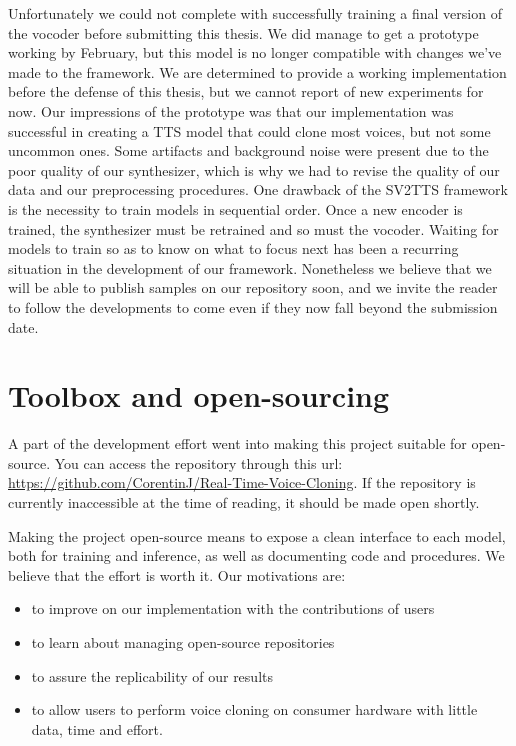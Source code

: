 \documentclass[a4paper, oneside, 12pt, english]{article}
\begin{document}
Unfortunately we could not complete with successfully training a final version of the vocoder before submitting this thesis. We did manage to get a prototype working by February, but this model is no longer compatible with changes we've made to the framework. We are determined to provide a working implementation before the defense of this thesis, but we cannot report of new experiments for now. Our impressions of the prototype was that our implementation was successful in creating a TTS model that could clone most voices, but not some uncommon ones. Some artifacts and background noise were present due to the poor quality of our synthesizer, which is why we had to revise the quality of our data and our preprocessing procedures. One drawback of the SV2TTS framework is the necessity to train models in sequential order. Once a new encoder is trained, the synthesizer must be retrained and so must the vocoder. Waiting for models to train so as to know on what to focus next has been a recurring situation in the development of our framework. Nonetheless we believe that we will be able to publish samples on our repository soon, and we invite the reader to follow the developments to come even if they now fall beyond the submission date.


\section{Toolbox and open-sourcing}
A part of the development effort went into making this project suitable for open-source. You can access the repository through this url: \url{https://github.com/CorentinJ/Real-Time-Voice-Cloning}. If the repository is currently inaccessible at the time of reading, it should be made open shortly.

Making the project open-source means to expose a clean interface to each model, both for training and inference, as well as documenting code and procedures. We believe that the effort is worth it. Our motivations are:
\begin{itemize}
	\item to improve on our implementation with the contributions of users
	\item to learn about managing open-source repositories
	\item to assure the replicability of our results
	\item to allow users to perform voice cloning on consumer hardware with little data, time and effort.
\end{itemize}
\end{document}
